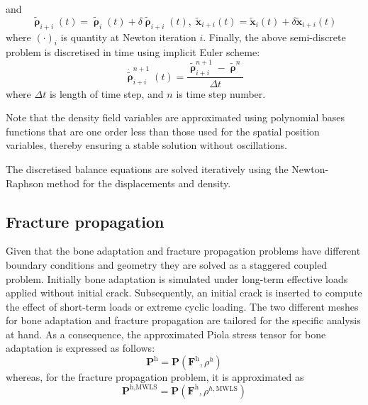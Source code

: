 \documentclass[review]{elsarticle}
\numberwithin{equation}{section}
\begin{document}
and 
\begin{equation}
\tilde{\pmb\uprho}_{i+i}(t) =
\tilde{\pmb\uprho}_{i}(t) + \delta\tilde{\pmb\uprho}_{i+i}(t),\;
	\tilde{\mathbf{x}}_{i+i}(t) =
	\tilde{\mathbf{x}}_{i}(t) + \delta\tilde{\mathbf{x}}_{i+i}(t)
\end{equation}
where $(\cdot)_i$ is quantity at Newton iteration $i$. Finally, the
above semi-discrete problem is discretised in time using implicit Euler scheme:
\begin{equation}
	\dot{\tilde{\pmb\uprho}}_{i+i}^{n+1}(t) =
	\frac{
	\tilde{\pmb\uprho}_{i+i}^{n+1}-\tilde{\pmb\uprho}^{n}
	}{\Delta t}
\end{equation}
where $\Delta t$ is length of time step, and $n$ is time step number.

Note that the density field variables are approximated using polynomial bases functions that are one order less than those used for the spatial position variables, thereby ensuring a stable solution without oscillations.

The discretised balance equations are solved iteratively using the Newton-Raphson method for the displacements and density.

%
%
\subsection{Fracture propagation} \label{sec:fem_fracture_prop}

Given that the bone adaptation and fracture propagation problems have different boundary conditions and geometry they are solved as 
a staggered coupled problem. Initially bone adaptation is simulated under 
long-term effective loads applied without initial crack. Subsequently, an 
initial crack is inserted to compute the effect 
of short-term loads or extreme cyclic loading. The two different meshes for bone adaptation and fracture propagation 
are tailored for the specific analysis at hand. As
a consequence, the approximated Piola stress tensor for bone
adaptation is expressed as follows:
\begin{equation}
	\mathbf{P}^\textrm{h} = 
		\mathbf{P}(\mathbf{F}^\textrm{h}, \rho^h)
\end{equation}
whereas, for the fracture propagation problem, it is approximated as
\begin{equation}
	\mathbf{P}^{\textrm{h},\textrm{MWLS}} = 
		\mathbf{P}(
		\mathbf{F}^\textrm{h}, \rho^{h,\textrm{MWLS}})
\end{equation}
\end{document}
